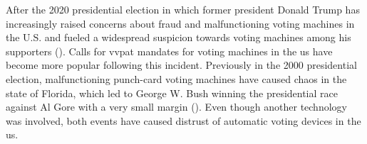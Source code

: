 After the 2020 presidential election in which former president Donald Trump has increasingly raised concerns about fraud and malfunctioning voting machines in the U.S. and fueled a widespread suspicion towards voting machines among his supporters (\cite{Giles.2020}). Calls for \acrshort{vvpat} mandates for voting machines in the \acrshort{us} have become more popular following this incident. Previously in the 2000 presidential election, malfunctioning punch-card voting machines have caused chaos in the state of Florida, which led to George W. Bush winning the presidential race against Al Gore with a very small margin (\cite{Kettle.2001}). Even though another technology was involved, both events have caused distrust of automatic voting devices in the \acrshort{us}.


